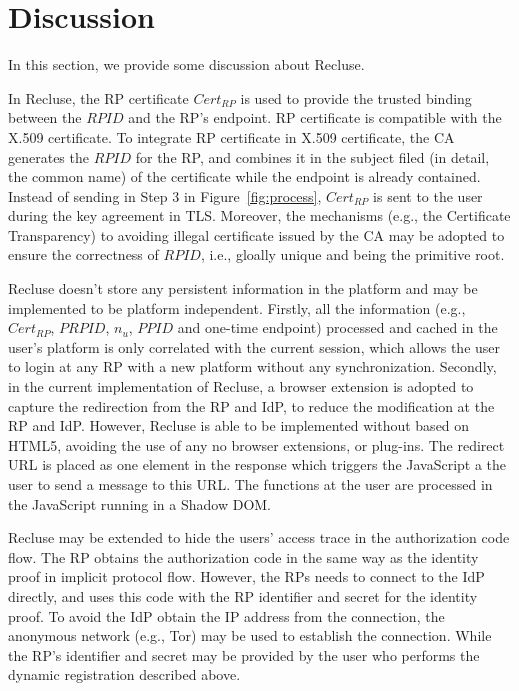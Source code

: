 \section{Discussion}
\label{sec:discussion}
In this section, we provide some discussion about Recluse.

 In Recluse, the RP certificate $Cert_{RP}$ is used to provide the trusted binding between the $RPID$ and the RP's endpoint. RP certificate is compatible with the X.509 certificate. To integrate RP certificate in X.509 certificate, the CA generates the $RPID$ for the RP, and combines it in the subject  filed (in detail, the common name)  of the certificate while the endpoint is already contained. Instead of sending  in Step 3 in Figure~\ref{fig:process}, $Cert_{RP}$  is sent to the user during the key agreement in TLS. Moreover, the mechanisms (e.g., the Certificate Transparency) to avoiding illegal certificate issued by the CA may be adopted to ensure the correctness of $RPID$, i.e., gloally unique and being the primitive root.


 Recluse doesn't store any persistent  information in the platform and may be implemented to be platform independent. Firstly, all the information (e.g., $Cert_{RP}$, $PRPID$, $n_u$, $PPID$ and one-time endpoint) processed and cached in the user's platform is only correlated with the current session, which allows the user to login at any RP with a new platform without any synchronization. Secondly, in the current implementation of Recluse, a browser extension is adopted to capture the redirection from the RP and IdP, to reduce the modification at the RP and IdP. However, Recluse is able to be implemented without based on HTML5, avoiding the use of any no browser extensions, or plug-ins. The redirect URL is placed as one element in the response which triggers the JavaScript a the user to send a message to this URL. The functions at the user are processed in the JavaScript running in a Shadow DOM.


 Recluse may be extended to hide the users' access trace in  the authorization code flow. The RP obtains the authorization code in the same way as the  identity proof in implicit protocol flow. However, the RPs needs to connect to the IdP directly, and  uses this code with  the RP identifier and secret for the identity proof. To avoid the IdP obtain the IP address from the connection, the anonymous network (e.g., Tor) may be used to establish the connection. While the RP's identifier and secret may be provided by the user who performs the dynamic registration described above.


